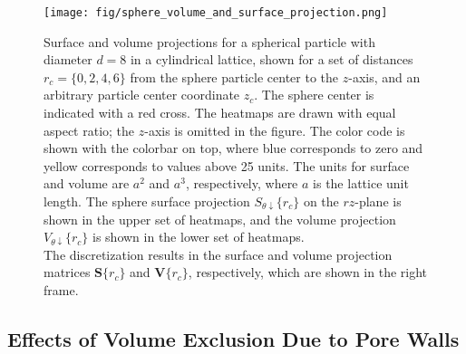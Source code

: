 \documentclass[10pt, a4paper]{article}
\begin{document}
\begin{figure}[H]
    \centering
    \texttt{[image: fig/sphere\_volume\_and\_surface\_projection.png]}
    \caption{
        Surface and volume projections for a spherical particle with diameter $d = 8$ in a cylindrical lattice, shown for a set of distances $r_c = \{0, 2, 4, 6\}$ from the sphere particle center to the $z$-axis, and an arbitrary particle center coordinate $z_c$.
        The sphere center is indicated with a red cross.
        The heatmaps are drawn with equal aspect ratio; the $z$-axis is omitted in the figure.
        The color code is shown with the colorbar on top, where blue corresponds to zero and yellow corresponds to values above 25 units.
        The units for surface and volume are $a^2$ and $a^3$, respectively, where $a$ is the lattice unit length.
        The sphere surface projection $S_{\theta \downarrow}\{r_c\}$ on the $rz$-plane is shown in the upper set of heatmaps, and the volume projection $V_{\theta \downarrow}\{r_c\}$ is shown in the lower set of heatmaps.
        \\
        The discretization results in the surface and volume projection matrices $\bm{S}\{r_c\}$ and $\bm{V}\{r_c\}$, respectively, which are shown in the right frame.
    }
    \label{fig:sphere_volume_and_surface_projection}
\end{figure}

\subsection*{Effects of Volume Exclusion Due to Pore Walls}
\end{document}
